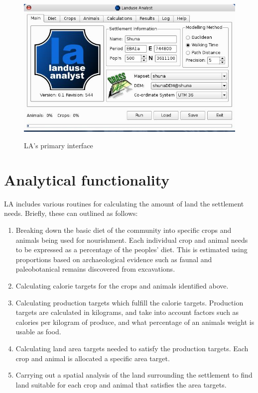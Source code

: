 \begin{figure}[htbp] %
  \includegraphics[scale=0.36]{./images/LanduseAnalyst544.jpg}
   \label{fig:la544} \caption{LA's primary interface}
   \end{figure}


\section{Analytical functionality} \label{sec:Analytical Functionality}

LA includes various routines for calculating the amount of land 
the settlement needs.  Briefly, these can outlined as follows:

  \begin{enumerate} 
  \item Breaking down the basic diet of the community into specific crops and
  animals being used for nourishment.  Each individual crop and animal needs to
  be expressed as a percentage of the peoples' diet.  This is estimated using
  proportions based on archaeological evidence such as faunal and
  paleobotanical remains discovered from excavations.  
  \item Calculating  calorie targets for the crops and animals identified above.  
  \item Calculating production targets which fulfill the calorie targets.
  Production targets are calculated in kilograms, and take into account factors such as 
  calories per kilogram of produce, and what percentage of an animals weight is
  usable as food.  
  \item Calculating land area targets needed to satisfy the
  production targets.  Each crop and animal is allocated a specific area
  target.  
  \item Carrying out a spatial analysis of the land surrounding the settlement to
  find land suitable for each crop and animal that satisfies the area targets.  
  \end{enumerate}


